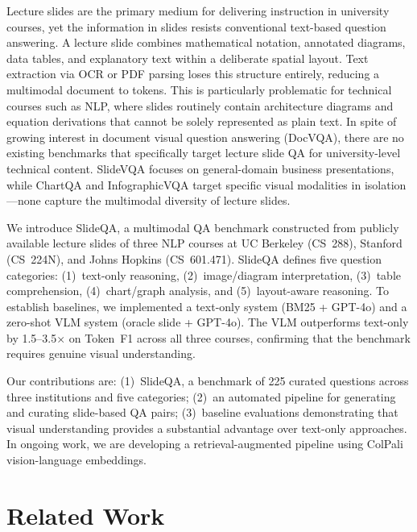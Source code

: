 \documentclass{article} %
\begin{document}
Lecture slides are the primary medium for delivering instruction in university courses, yet the information in slides resists conventional text-based question answering. A lecture slide combines mathematical notation, annotated diagrams, data tables, and explanatory text within a deliberate spatial layout. Text extraction via OCR or PDF parsing loses this structure entirely, reducing a multimodal document to tokens. This is particularly problematic for technical courses such as NLP, where slides routinely contain architecture diagrams and equation derivations that cannot be solely represented as plain text. In spite of growing interest in document visual question answering (DocVQA), there are no existing benchmarks that specifically target lecture slide QA for university-level technical content. SlideVQA \citep{tanaka2023slidevqa} focuses on general-domain business presentations, while ChartQA \citep{masry2022chartqa} and InfographicVQA \citep{mathew2021infographicvqa} target specific visual modalities in isolation---none capture the multimodal diversity of lecture slides.

We introduce SlideQA, a multimodal QA benchmark constructed from publicly available lecture slides of three NLP courses at UC Berkeley (CS~288), Stanford (CS~224N), and Johns Hopkins (CS~601.471). SlideQA defines five question categories: (1)~text-only reasoning, (2)~image/diagram interpretation, (3)~table comprehension, (4)~chart/graph analysis, and (5)~layout-aware reasoning. To establish baselines, we implemented a text-only system (BM25 + GPT-4o) and a zero-shot VLM system (oracle slide + GPT-4o). The VLM outperforms text-only by 1.5--3.5$\times$ on Token~F1 across all three courses, confirming that the benchmark requires genuine visual understanding.

Our contributions are: (1)~SlideQA, a benchmark of 225 curated questions across three institutions and five categories; (2)~an automated pipeline for generating and curating slide-based QA pairs; (3)~baseline evaluations demonstrating that visual understanding provides a substantial advantage over text-only approaches. In ongoing work, we are developing a retrieval-augmented pipeline using ColPali \citep{faysse2024colpali} vision-language embeddings.

\section{Related Work}
\end{document}
